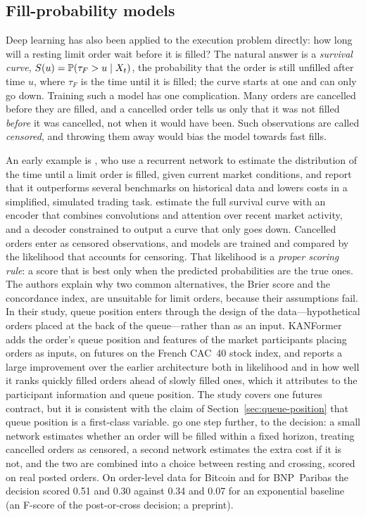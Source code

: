 \subsection{Fill-probability models}
\label{sec:deep-fill}

Deep learning has also been applied to the execution problem directly: how long will a resting limit order wait
before it is filled? The natural answer is a \emph{survival curve}, $S(u) = \P(\tau_F > u \mid X_t)$, the probability
that the order is still unfilled after time $u$, where $\tau_F$ is the time until it is filled; the curve starts at
one and can only go down. Training such a model has one complication. Many orders are cancelled before they are
filled, and a cancelled order tells us only that it was not filled \emph{before} it was cancelled, not when it would
have been. Such observations are called \emph{censored}, and throwing them away would bias the model towards fast
fills.

An early example is \citet{maglaras2022fill}, who use a recurrent network to estimate the distribution of the time
until a limit order is filled, given current market conditions, and report that it outperforms several benchmarks on
historical data and lowers costs in a simplified, simulated trading task.
\citet{arroyo2024} estimate the full survival curve with an encoder that combines convolutions and attention over
recent market activity, and a decoder constrained to output a curve that only goes down. Cancelled orders enter as
censored observations, and models are trained and compared by the likelihood that accounts for censoring. That
likelihood is a \emph{proper scoring rule}: a score that is best only when the predicted probabilities are the true
ones. The authors explain why two common alternatives, the Brier score and the concordance index, are unsuitable for
limit orders, because their assumptions fail. In their study, queue position enters through the design of the data---hypothetical orders placed at the back of the queue---rather than as an input. KANFormer~\citep{kanformer} adds the
order's queue position and features of the market participants placing orders as inputs, on futures on the French CAC~40
stock index, and reports a large improvement over the earlier architecture both in likelihood and in how well it ranks
quickly filled orders ahead of slowly filled ones, which it attributes to the participant information and queue
position. The study covers one futures contract, but it is consistent with the claim of
Section~\ref{sec:queue-position} that queue position is a first-class variable. \citet{fabre2023interpretable} go
one step further, to the decision: a small network estimates whether an order will be filled within a fixed horizon,
treating cancelled orders as censored, a second network estimates the extra cost if it is not, and the two are combined
into a choice between resting and crossing, scored on real posted orders. On order-level data for Bitcoin and
for BNP~Paribas the decision scored 0.51 and 0.30 against 0.34 and 0.07 for an exponential baseline (an F-score of the
post-or-cross decision; a preprint).

